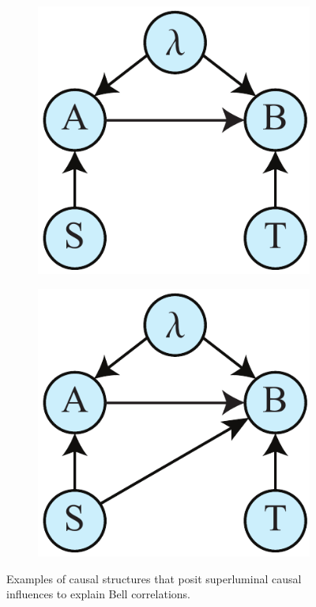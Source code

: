 \documentclass[letterpaper,onecolumn,nofootinbib]{revtex4}
\begin{document}
\begin{figure}[h]
\begin{subfigure}[b]{0.18\textwidth}
        	\includegraphics[width=\textwidth]{bell-superlum-2}
             	\subcaption{}
                	\label{fig:bell-AtoB}
        \end{subfigure}
        \hspace{5em}
                \begin{subfigure}[b]{0.18\textwidth}
                	\centering
        	\includegraphics[width=\textwidth]{bell-superlum}
             	\subcaption{}
                	\label{fig:bell-SAtoB}
        \end{subfigure}
 \caption{Examples of causal structures that posit superluminal causal influences to explain Bell correlations.}
\label{fig:bell-SandAtoB}
\end{figure}
\end{document}
